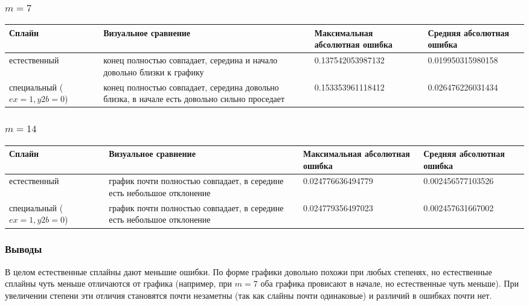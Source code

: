 \documentclass[paper=a4, fontsize=11pt]{scrartcl} %
\numberwithin{equation}{section} %
\numberwithin{figure}{section} %
\numberwithin{table}{section} %
\begin{document}
\subsubsection{$m=7$}

\begin{tabular}{|p{4 cm}|p{4 cm}|p{4 cm}|p{4 cm}|}
\hline
	Сплайн & Визуальное сравнение & Максимальная абсолютная ошибка & Средняя абсолютная ошибка\\
\hline
	естественный & конец полностью совпадает, середина и начало довольно близки к графику & 0.137542053987132 & 0.019950315980158\\
\hline
	специальный ($ex=1,y2b=0$) & конец полностью совпадает, середина довольно близка, в начале есть довольно сильно проседает & 0.153353961118412 & 0.026476226031434\\
\hline
\end{tabular}

\subsubsection{$m=14$}

\begin{tabular}{|p{4 cm}|p{4 cm}|p{4 cm}|p{4 cm}|}
\hline
	Сплайн & Визуальное сравнение & Максимальная абсолютная ошибка & Средняя абсолютная ошибка\\
\hline
	естественный & график почти полностью совпадает, в середине есть небольшое отклонение & 0.024776636494779 & 0.002456577103526\\
\hline
	специальный ($ex=1,y2b=0$) & график почти полностью совпадает, в середине есть небольшое отклонение & 0.024779356497023 & 0.002457631667002\\
\hline
\end{tabular}

\subsubsection{Выводы}

В целом естественные сплайны дают меньшие ошибки.
По форме графики довольно похожи при любых степенях, но естественные сплайны чуть меньше отличаются от графика (например, при $m=7$ оба графика провисают в начале, но естественные чуть меньше).
При увеличении степени эти отличия становятся почти незаметны (так как слайны почти одинаковые) и различий в ошибках почти нет.
\end{document}
